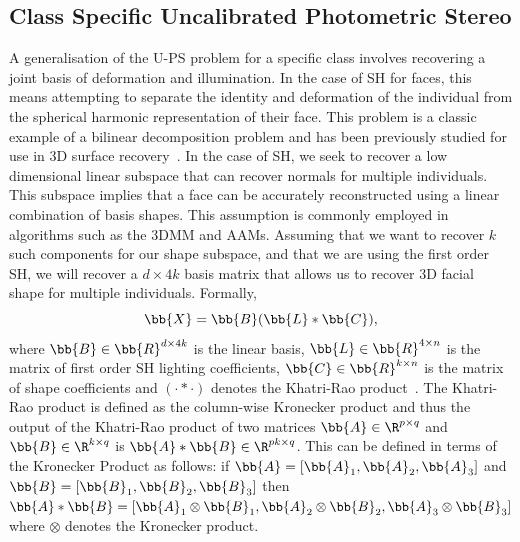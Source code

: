 \subsection{Class Specific Uncalibrated Photometric Stereo}\label{subsec:imag_coll_class_uncalibrated_ps}
A generalisation of the U-PS problem for a specific class involves
recovering a joint basis of deformation and illumination. In the case of SH for
faces, this means attempting to separate the identity and deformation of the
individual from the spherical harmonic representation of their face.
This problem is a classic example of a bilinear
decomposition problem and has been previously studied for use in 3D surface
recovery~\cite{zhou2007appearance,minsik2014realtime,minsik2011fast,%
lee2005bilinear,KemelmacherShlizerman:2013iv}. In
the case of SH, we seek to recover a low dimensional linear subspace that can
recover normals for multiple individuals. This subspace implies that a face can
be accurately reconstructed using a linear combination of basis shapes. This
assumption is commonly employed in algorithms such as the 3DMM and AAMs.
Assuming that we want to recover $k$ such components for our shape subspace, and
that we are using the first order SH, we will recover a $d \times 4k$ basis
matrix that allows us to recover 3D facial shape for multiple individuals.
Formally,
\begin{equation}\label{eq:class_specific_ps}
        \bb{X} = \bb{B} (\bb{L} \ast \bb{C}),
\end{equation}
where $\bb{B} \in \bb{R}^{d \times 4k}$ is the linear basis,
$\bb{L} \in \bb{R}^{4 \times n}$ is the matrix of first order SH lighting
coefficients, $\bb{C} \in \bb{R}^{k \times n}$ is the matrix of shape
coefficients and $(\cdot \ast \cdot)$ denotes the Khatri-Rao
product~\cite{khatri1968solutions}. The Khatri-Rao product is defined as the
column-wise Kronecker product and thus the output of the Khatri-Rao product
of two matrices $\bb{A} \in \R^{p \times q}$ and $\bb{B} \in \R^{k \times q}$
is $\bb{A} \ast \bb{B} \in \R^{pk \times q}$. This can be defined in terms
of the Kronecker Product as follows: if
$\bb{A} = \left[ \bb{A}_1, \bb{A}_2, \bb{A}_3 \right]$ and
$\bb{B} = \left[ \bb{B}_1, \bb{B}_2, \bb{B}_3 \right]$ then
$\bb{A} \ast \bb{B} = \left[ \bb{A}_1 \otimes \bb{B}_1, \bb{A}_2 \otimes \bb{B}_2, \bb{A}_3 \otimes \bb{B}_3 \right]$ where $\otimes$ denotes the Kronecker product.

